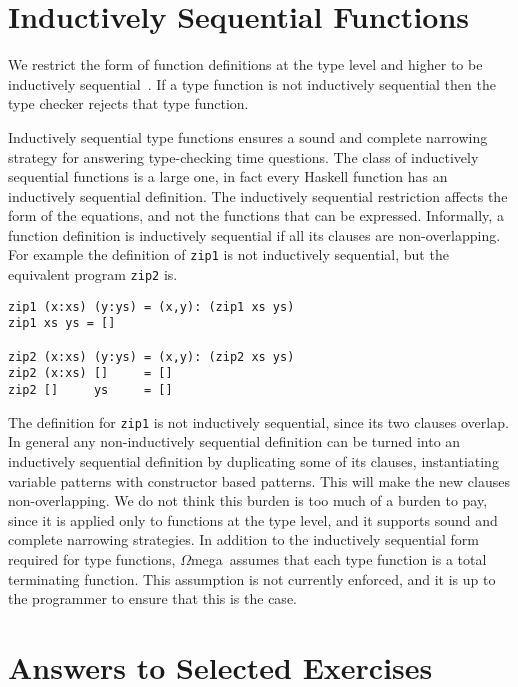 \documentclass[11pt,twoside,A4]{llncs}
\newcommand{\om}{\emph{$\Omega$}mega}
\begin{document}
\section{Inductively Sequential Functions} \label{IndSeq}
We restrict the form of function definitions at the type level and higher to be inductively
sequential~\cite{conf/alp/Antoy92}. If a type function is not
inductively sequential then the type checker rejects that type function.

Inductively sequential type functions ensures a sound and complete narrowing strategy for answering 
type-checking time questions. The class of inductively sequential functions is a large
one, in fact every Haskell function has an inductively sequential definition. The
inductively sequential restriction affects the form of the equations, and not the
functions that can be expressed. Informally, a function definition is
inductively sequential if all its clauses are non-overlapping. For example
the definition of {\tt zip1} is not inductively sequential, but the equivalent
program {\tt zip2} is.

{\small
\begin{verbatim}
zip1 (x:xs) (y:ys) = (x,y): (zip1 xs ys)
zip1 xs ys = []

zip2 (x:xs) (y:ys) = (x,y): (zip2 xs ys)
zip2 (x:xs) []     = []
zip2 []     ys     = []
\end{verbatim}}

The definition for {\tt zip1} is not inductively sequential, since its two clauses overlap. In general
any non-inductively sequential definition can be turned into an inductively
sequential definition by duplicating some of its clauses, instantiating variable patterns
with constructor based patterns. This will make the new clauses non-overlapping.
We do not think this burden is too much of a burden to pay, since
it is applied only to functions at the type level, and it supports
sound and complete narrowing strategies. In addition to the 
inductively sequential form required for type functions, \om\ assumes that
each type function is a total terminating function. This assumption
is not currently enforced, and it is up to the programmer
to ensure that this is the case.

\section{Answers to Selected Exercises} \label{answers}
\end{document}
